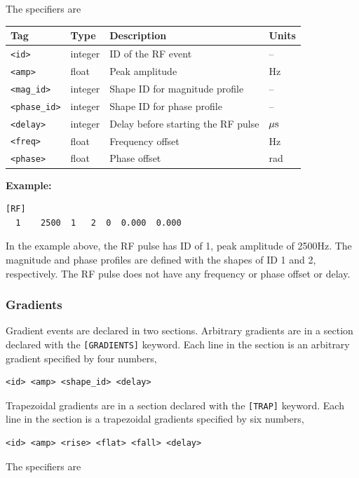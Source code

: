 \documentclass{article}
\begin{document}
The specifiers are

\begin{tabularx}{\textwidth}{llXl}
\toprule
Tag & Type & Description & Units\\
\midrule
\verb.<id>. & integer & ID of the RF event & -- \\
\verb.<amp>. & float & Peak amplitude & Hz \\
\verb.<mag_id>. & integer & Shape ID for magnitude profile & -- \\
\verb.<phase_id>. & integer & Shape ID for phase profile & --\\
\verb.<delay>. & integer & Delay before starting the RF pulse & $\rm \mu s$\\
\verb.<freq>. & float & Frequency offset & Hz \\
\verb.<phase>. & float & Phase offset & rad \\
\bottomrule
\end{tabularx}

\begin{minipage}{\textwidth}
\textbf{Example:}
\begin{lstlisting}
[RF]
  1    2500  1   2  0  0.000  0.000
\end{lstlisting}
\end{minipage}

In the example above, the RF pulse has ID of 1, peak amplitude of 2500Hz. The magnitude and phase profiles are defined with the shapes of ID 1 and 2, respectively. The RF pulse does not have any frequency or phase offset or delay.

\subsubsection{Gradients}
Gradient events are declared in two sections. Arbitrary gradients are in a section declared with the \verb.[GRADIENTS]. keyword. Each line in the section is an arbitrary gradient specified by four numbers,
\begin{lstlisting}
<id> <amp> <shape_id> <delay>
\end{lstlisting}
Trapezoidal gradients are in a section declared with the \verb.[TRAP]. keyword. Each line in the section is a trapezoidal gradients specified by six numbers,
\begin{lstlisting}
<id> <amp> <rise> <flat> <fall> <delay>
\end{lstlisting}

The specifiers are
\end{document}
